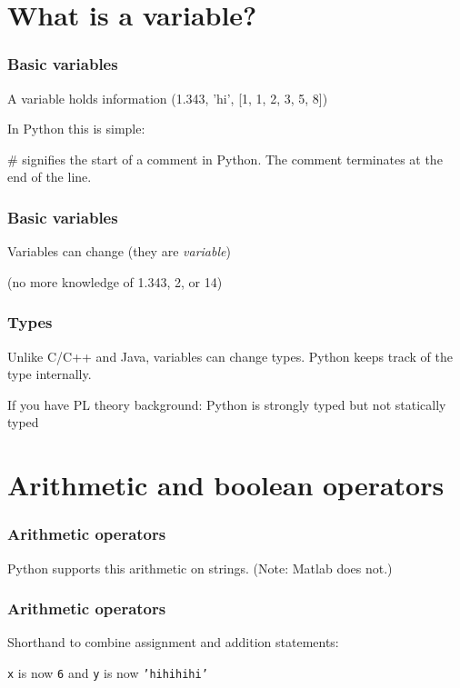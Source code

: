 \documentclass{beamer}
\begin{document}
\section{What is a variable?}
\begin{frame}
\frametitle{Basic variables}

A variable holds information (1.343, 'hi', [1, 1, 2, 3, 5, 8])

\vspace{0.2in}

In Python this is simple:


\textcolor{comment-color}{\#} signifies the start of a comment in Python.  The comment terminates at the end of the line.

\end{frame}


\begin{frame}
\frametitle{Basic variables}

Variables can change (they are \emph{variable})



(no more knowledge of 1.343, 2, or 14)

\end{frame}

\begin{frame}
\frametitle{Types}
Unlike C/C++ and Java, variables can change types. Python keeps track of the type internally.


If you have PL theory background: Python is strongly typed but not statically typed

\end{frame}


\section{Arithmetic and boolean operators}

\begin{frame}
\frametitle{Arithmetic operators}



Python supports this arithmetic on strings.  (Note: Matlab does not.)
\end{frame}

\begin{frame}
\frametitle{Arithmetic operators}

Shorthand to combine assignment and addition statements:



\vspace{0.1in}

\texttt{x} is now \texttt{6} and \texttt{y} is now \textcolor{string-color}{\texttt{'hihihihi'}}

\end{frame}
\end{document}
